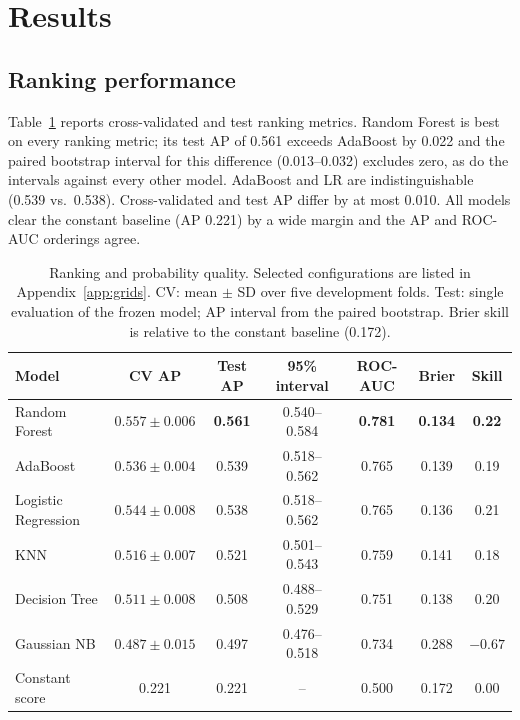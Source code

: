 \documentclass{article}
\begin{document}
\section{Results}
\label{sec:results}
\subsection{Ranking performance}
Table~\ref{tab:ranking} reports cross-validated and test ranking metrics. Random Forest is best on every ranking metric; its test AP of 0.561 exceeds AdaBoost by 0.022 and the paired bootstrap interval for this difference (0.013--0.032) excludes zero, as do the intervals against every other model. AdaBoost and LR are indistinguishable (0.539 vs.\ 0.538). Cross-validated and test AP differ by at most 0.010. All models clear the constant baseline (AP 0.221) by a wide margin and the AP and ROC-AUC orderings agree.

\begin{table}[t]
  \caption{Ranking and probability quality. Selected configurations are listed in Appendix~\ref{app:grids}. CV: mean $\pm$ SD over five development folds. Test: single evaluation of the frozen model; AP interval from the paired bootstrap. Brier skill is relative to the constant baseline (0.172).}
  \label{tab:ranking}
  \centering
  \small
  \begin{tabular}{@{}lcccccc@{}}
    \toprule
    Model & CV AP & Test AP & 95\% interval & ROC-AUC & Brier & Skill \\
    \midrule
    Random Forest & $0.557\pm0.006$ & \textbf{0.561} & 0.540--0.584 & \textbf{0.781} & \textbf{0.134} & \textbf{0.22} \\
    AdaBoost & $0.536\pm0.004$ & 0.539 & 0.518--0.562 & 0.765 & 0.139 & 0.19 \\
    Logistic Regression & $0.544\pm0.008$ & 0.538 & 0.518--0.562 & 0.765 & 0.136 & 0.21 \\
    KNN & $0.516\pm0.007$ & 0.521 & 0.501--0.543 & 0.759 & 0.141 & 0.18 \\
    Decision Tree & $0.511\pm0.008$ & 0.508 & 0.488--0.529 & 0.751 & 0.138 & 0.20 \\
    Gaussian NB & $0.487\pm0.015$ & 0.497 & 0.476--0.518 & 0.734 & 0.288 & $-0.67$ \\
    \midrule
    Constant score & 0.221 & 0.221 & -- & 0.500 & 0.172 & 0.00 \\
    \bottomrule
  \end{tabular}
\end{table}
\end{document}

